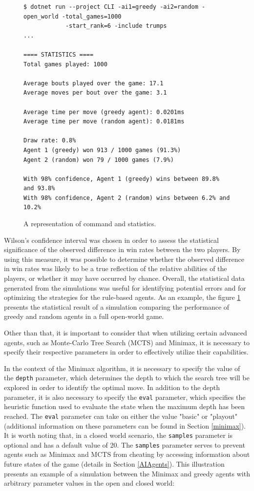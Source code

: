 \begin{figure}[h]
\captionsetup{justification=centering}
\begin{lstlisting}[frame=single]
$ dotnet run --project CLI -ai1=greedy -ai2=random -open_world -total_games=1000 
			-start_rank=6 -include trumps
...

==== STATISTICS ====
Total games played: 1000

Average bouts played over the game: 17.1
Average moves per bout over the game: 3.1

Average time per move (greedy agent): 0.0201ms
Average time per move (random agent): 0.0181ms

Draw rate: 0.8%
Agent 1 (greedy) won 913 / 1000 games (91.3%)
Agent 2 (random) won 79 / 1000 games (7.9%)

With 98% confidence, Agent 1 (greedy) wins between 89.8% and 93.8% 
With 98% confidence, Agent 2 (random) wins between 6.2% and 10.2% 
\end{lstlisting}
\caption{A representation of command and statistics.}
\label{fig:statistics}
\end{figure}

Wilson's confidence interval was chosen in order to assess the statistical significance of the observed difference in win rates between the two players. By using this measure, it was possible to determine whether the observed difference in win rates was likely to be a true reflection of the relative abilities of the players, or whether it may have occurred by chance. Overall, the statistical data generated from the simulations was useful for identifying potential errors and for optimizing the strategies for the rule-based agents. As an example, the figure \ref{fig:statistics}  presents the statistical result of a simulation comparing the performance of greedy and random agents in a full open-world game.

Other than that, it is important to consider that when utilizing certain advanced agents, such as Monte-Carlo Tree Search (MCTS) and Minimax, it is necessary to specify their respective parameters in order to effectively utilize their capabilities. 

In the context of the Minimax algorithm, it is necessary to specify the value of the \texttt{depth} parameter, which determines the depth to which the search tree will be explored in order to identify the optimal move. In addition to the depth parameter, it is also necessary to specify the \texttt{eval} parameter, which specifies the heuristic function used to evaluate the state when the maximum depth has been reached. The \texttt{eval} parameter can take on either the value "basic" or "playout" (additional information on these parameters can be found in Section \ref{minimax}). It is worth noting that, in a closed world scenario, the \texttt{samples} parameter is optional and has a default value of 20. The \texttt{samples} parameter serves to prevent agents such as Minimax and MCTS from cheating by accessing information about future states of the game (details in Section \ref{AIAgents}). This illustration presents an example of a simulation between the Minimax and greedy agents with arbitrary parameter values in the open and closed world:\\

